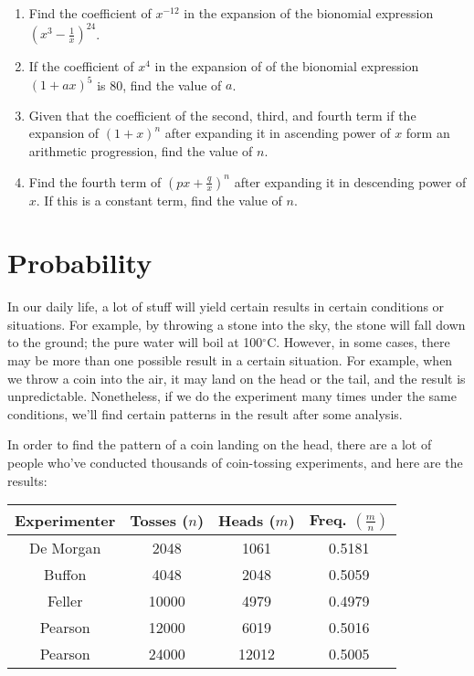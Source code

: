 \documentclass{report}
\begin{document}
\begin{multicols}{2}
\begin{enumerate}
    \item Find the coefficient of $x^{-12}$ in the expansion of the bionomial expression
          $\left(x^3 - \frac{1}{x}\right)^{24}$.

    \item If the coefficient of $x^4$ in the expansion of of the bionomial expression $(1
            + ax)^5$ is 80, find the value of $a$.

    \item Given that the coefficient of the second, third, and fourth term if the
          expansion of $(1 + x)^n$ after expanding it in ascending power of $x$ form an
          arithmetic progression, find the value of $n$.

    \item Find the fourth term of $\left(px + \frac{q}{x}\right)^n$ after expanding it in
          descending power of $x$. If this is a constant term, find the value of $n$.
  \end{enumerate}

  \chapter{Probability}

  In our daily life, a lot of stuff will yield certain results in certain
  conditions or situations. For example, by throwing a stone into the sky, the
  stone will fall down to the ground; the pure water will boil at 100$^\circ$C.
  However, in some cases, there may be more than one possible result in a certain
  situation. For example, when we throw a coin into the air, it may land on the
  head or the tail, and the result is unpredictable. Nonetheless, if we do the
  experiment many times under the same conditions, we'll find certain patterns in
  the result after some analysis.

  In order to find the pattern of a coin landing on the head, there are a lot of
  people who've conducted thousands of coin-tossing experiments, and here are the
  results:

  \begin{center}
    \begin{tabular}{|c|c|c|c|}
      \hline
      Experimenter & Tosses ($n$) & Heads ($m$) & Freq. $\left(\frac{m}{n}\right)$ \\
      \hline
      De Morgan    & 2048         & 1061        & 0.5181                           \\
      Buffon       & 4048         & 2048        & 0.5059                           \\
      Feller       & 10000        & 4979        & 0.4979                           \\
      Pearson      & 12000        & 6019        & 0.5016                           \\
      Pearson      & 24000        & 12012       & 0.5005                           \\
      \hline
    \end{tabular}
  \end{center}


\end{multicols}
\end{document}

